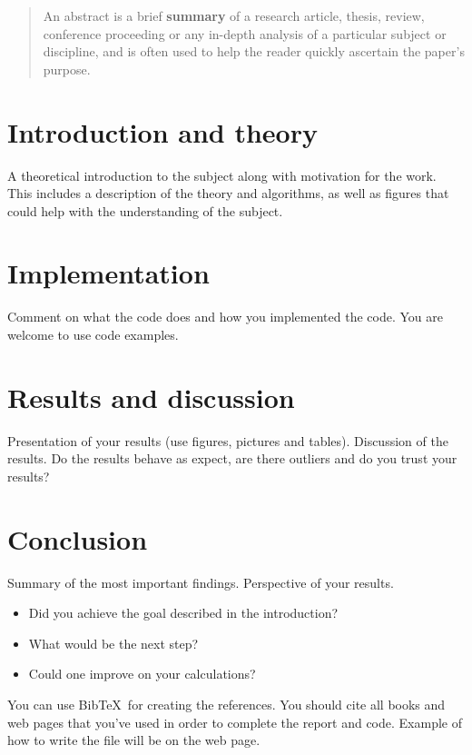 \documentclass{article}
\begin{document}
\begin{abstract}
An abstract is a brief \textbf{summary} of a research article, thesis,
review, conference proceeding or any in-depth analysis of a particular subject or discipline, and is
often used to help the reader quickly ascertain the paper’s purpose.
\end{abstract}

\section{Introduction and theory}
 A theoretical introduction to the subject along with motivation for
the work. This includes a description of the theory and algorithms, as well as figures that could
help with the understanding of the subject.

\section{Implementation}
 Comment on what the code does and how you implemented the code. You are welcome to use code examples.
 \section{Results and discussion}
 Presentation of your results (use figures, pictures and tables). Discussion
of the results. Do the results behave as expect, are there outliers and do you trust your results?
\section{Conclusion} Summary of the most important findings. Perspective of your results.
\begin{itemize}
\item Did you achieve the goal described in the introduction?
\item What would be the next step?
\item Could one improve on your calculations?
\end{itemize}

\vspace{40pt}
You can use Bib\TeX \ for creating the references. You should cite all books \cite{thinkPyhton} and web pages \cite{The_Listings_Package} that you've used in order to complete the report and code. 
Example of how to write the  file will be on the web page. 







\end{document}
